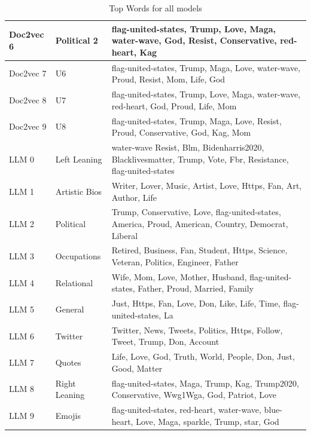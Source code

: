 \documentclass{article}
\begin{document}
\begin{table}[h!]
\begin{tabular}{|l|l|p{13cm}|}
 Doc2vec 6 & Political 2 & flag-united-states, Trump, Love, Maga, water-wave, God, Resist, Conservative, red-heart, Kag \\ \hline
 Doc2vec 7 & U6 & flag-united-states, Trump, Maga, Love, water-wave, Proud, Resist, Mom, Life, God \\ \hline
 Doc2vec 8 & U7 & flag-united-states, Trump, Love, Maga, water-wave, red-heart, God, Proud, Life, Mom \\ \hline
 Doc2vec 9 & U8 & flag-united-states, Trump, Maga, Love, Resist, Proud, Conservative, God, Kag, Mom \\ \hline
 LLM 0 & Left Leaning & water-wave Resist, Blm, Bidenharris2020, Blacklivesmatter, Trump, Vote, Fbr, Resistance, flag-united-states \\ \hline 
 LLM 1 & Artistic Bios & Writer, Lover, Music, Artist, Love, Https, Fan, Art, Author, Life \\ \hline
 LLM 2 & Political & Trump, Conservative, Love, flag-united-states, America, Proud, American, Country, Democrat, Liberal \\ \hline
 LLM 3 & Occupations & Retired, Business, Fan, Student, Https, Science, Veteran, Politics, Engineer, Father \\ \hline
 LLM 4 & Relational & Wife, Mom, Love, Mother, Husband, flag-united-states, Father, Proud, Married, Family \\ \hline
 LLM 5 & General & Just, Https, Fan, Love, Don, Like, Life, Time, flag-united-states, La \\ \hline
 LLM 6 & Twitter & Twitter, News, Tweets, Politics, Https, Follow, Tweet, Trump, Don, Account \\ \hline
 LLM 7 & Quotes & Life, Love, God, Truth, World, People, Don, Just, Good, Matter \\ \hline
 LLM 8 & Right Leaning & flag-united-states, Maga, Trump, Kag, Trump2020, Conservative, Wwg1Wga, God, Patriot, Love \\ \hline
 LLM 9 & Emojis & flag-united-states, red-heart, water-wave, blue-heart, Love, Maga, sparkle, Trump, star, God \\ \hline
\end{tabular}
\caption{Top Words for all models}
\label{table:top_words}
\end{table}
\restoregeometry








\end{document}
